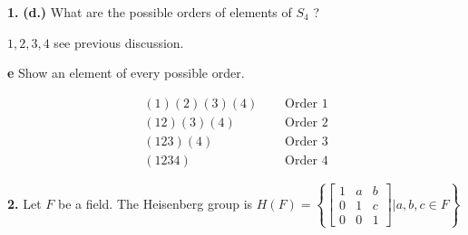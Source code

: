 \documentclass[notitlepage]{report}
\newcommand{\set}[1]{\left\lbrace #1 \right\rbrace}
\newcommand{\qt}[1]{\textrm{#1}}
\begin{document}
\textbf{1.} 
\textbf{(d.)} What are the possible orders of elements of $ S_4 $ ?
\begin{mdframed}[]
	$1,2,3,4$ see previous discussion.
\end{mdframed}
\textbf{e} Show an element of every possible order.
\begin{mdframed}[]
	\begin{align*}
	(1)(2)(3)(4) \quad &\qt{ Order } 1 \\
	(12)(3)(4) 	  \quad &\qt{ Order } 2 \\
	(123)(4)  \quad    &\qt{ Order } 3 \\
	(1234) \quad &\qt{ Order } 4
	\end{align*}
\end{mdframed}
\textbf{2.} Let $F$ be a field. The Heisenberg group is $H(F) = \set{\begin{bmatrix}
1 & a  & b \\
0 & 1 & c \\
0 & 0 & 1
\end{bmatrix} | a,b,c \in F}$
\end{document}
